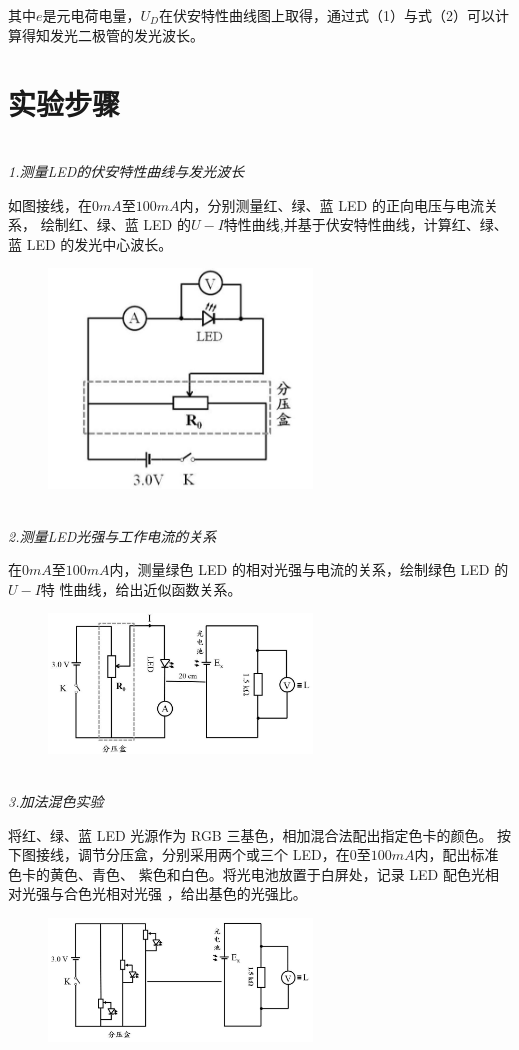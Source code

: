 \documentclass[UTF8]{ctexart}
\begin{document}
其中$e$是元电荷电量，$U_D$在伏安特性曲线图上取得，通过式（1）与式（2）可以计算得知发光二极管的发光波长。

    \section{实验步骤}

    \emph{\\[0.02cm]1.测量LED的伏安特性曲线与发光波长}

    如图接线，在$0mA$至$100mA$内，分别测量红、绿、蓝 LED 的正向电压与电流关系，
    绘制红、绿、蓝 LED 的$U-I$特性曲线,并基于伏安特性曲线，计算红、绿、蓝 LED 的发光中心波长。
    \begin{figure}[ht]
        \centering 
        \includegraphics[width=7cm]{fuantexing.png}
    \end{figure}

    \emph{\\[0.02cm]2.测量LED光强与工作电流的关系} 

    在$0mA$至$100mA$内，测量绿色 LED 的相对光强与电流的关系，绘制绿色 LED 的$U-I$特
    性曲线，给出近似函数关系。
    \begin{figure}[ht]
        \centering 
        \includegraphics[width=7cm]{faguagnqiangdu.png}
    \end{figure}

    \emph{\\[0.02cm]3.加法混色实验}

    将红、绿、蓝 LED 光源作为 RGB 三基色，相加混合法配出指定色卡的颜色。
    按下图接线，调节分压盒，分别采用两个或三个 LED，在$0$至$100mA$内，配出标准色卡的黄色、青色、
    紫色和白色。将光电池放置于白屏处，记录 LED 配色光相对光强与合色光相对光强 ，给出基色的光强比。
    \begin{figure}[ht]
        \centering 
        \includegraphics[width=7cm]{peise2.png}
    \end{figure}
\end{document}
